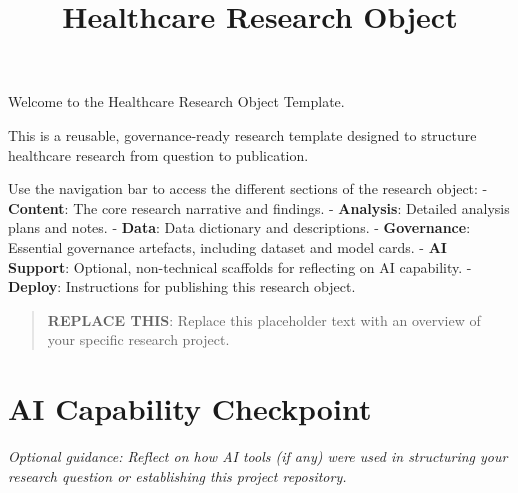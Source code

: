 \documentclass[
]{report}
\title{Healthcare Research Object}
\author{}
\date{}
\renewcommand*\contentsname{Table of contents}
\newcommand\contentsname{Table of contents}
\begin{document}
\maketitle

\renewcommand*\contentsname{Table of contents}
{
\hypersetup{linkcolor=}
\setcounter{tocdepth}{2}
\tableofcontents
}

Welcome to the Healthcare Research Object Template.

This is a reusable, governance-ready research template designed to
structure healthcare research from question to publication.

Use the navigation bar to access the different sections of the research
object: - \textbf{Content}: The core research narrative and findings. -
\textbf{Analysis}: Detailed analysis plans and notes. - \textbf{Data}:
Data dictionary and descriptions. - \textbf{Governance}: Essential
governance artefacts, including dataset and model cards. - \textbf{AI
Support}: Optional, non-technical scaffolds for reflecting on AI
capability. - \textbf{Deploy}: Instructions for publishing this research
object.

\begin{quote}
\textbf{REPLACE THIS}: Replace this placeholder text with an overview of
your specific research project.
\end{quote}

\chapter{AI Capability Checkpoint}\label{ai-capability-checkpoint}

\emph{Optional guidance: Reflect on how AI tools (if any) were used in
structuring your research question or establishing this project
repository.}
\end{document}
